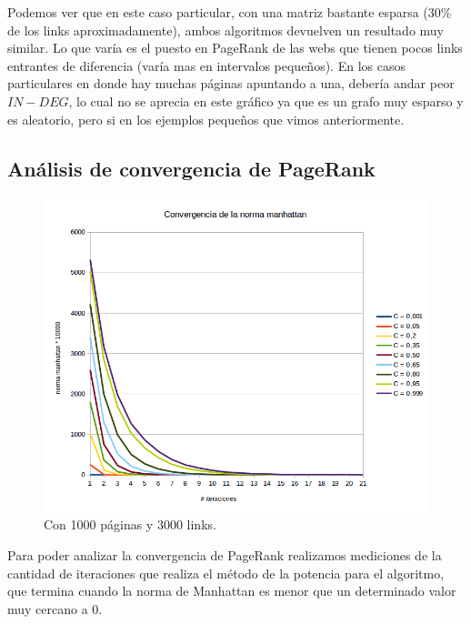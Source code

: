 Podemos ver que en este caso particular, con una matriz bastante esparsa (30\% de los links aproximadamente), ambos algoritmos devuelven un resultado muy similar. Lo que varía es el puesto en PageRank de las webs que tienen pocos links entrantes de diferencia (varía mas en intervalos pequeños). En los casos particulares en donde hay muchas páginas apuntando a una, debería andar peor $IN-DEG$, lo cual no se aprecia en este gráfico ya que es un grafo muy esparso y es aleatorio, pero si en los ejemplos pequeños que vimos anteriormente.\\


\subsection{Análisis de convergencia de PageRank}
\begin{figure}
  \vspace{-20pt}
  \begin{center}
    \includegraphics[scale= 0.6]{imagenes/convergencia1.png}
  \end{center}
  \vspace{-20pt}
   \caption{Con  1000 páginas y 3000 links.}
  \vspace{-10pt}
  \label{fig:img1}
\end{figure}

Para poder analizar la convergencia de PageRank realizamos mediciones de la cantidad de iteraciones que realiza el método de la potencia para el algoritmo, que termina cuando la norma de Manhattan es menor que un determinado valor muy cercano a 0.\\

